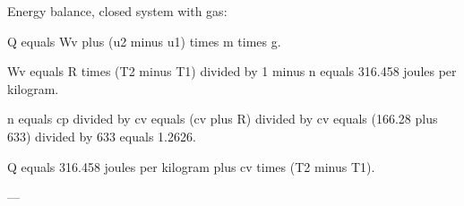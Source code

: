 Energy balance, closed system with gas:  

Q equals Wv plus (u2 minus u1) times m times g.  

Wv equals R times (T2 minus T1) divided by 1 minus n equals 316.458 joules per kilogram.  

n equals cp divided by cv equals (cv plus R) divided by cv equals (166.28 plus 633) divided by 633 equals 1.2626.  

Q equals 316.458 joules per kilogram plus cv times (T2 minus T1).  

---